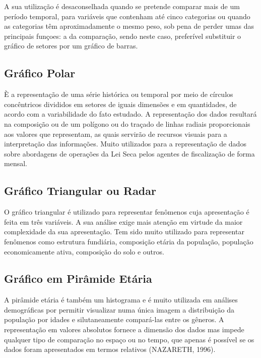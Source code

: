 A sua utilização é desaconselhada quando se pretende comparar mais
de um período temporal, para variáveis que contenham até cinco
categorias ou quando as categorias têm aproximadamente o mesmo
peso, sob pena de perder umas das principais funçoes: a da
comparação, sendo neste caso, preferível substituir o gráfico de
setores por um gráfico de barras.



\subsection{Gráfico Polar}

È a representação de uma série histórica ou temporal por meio de
círculos concêntricos divididos em setores de iguais dimensões e
em quantidades, de acordo com a variabilidade do fato estudado. A
representação dos dados resultará na composição ou de um polígono
ou do traçado de linhas radiais proporcionais aos valores que
representam, as quais servirão de recursos visuais para a
interpretação das informações. Muito utilizados para a
representação de dados sobre abordagens de operações da Lei Seca
pelos agentes de fiscalização de forma mensal.


\subsection{Gráfico Triangular ou Radar}

O gráfico triangular é utilizado para representar fenômenos cuja
apresentação é feita em três variáveis. A sua análise exige mais
atenção em virtude da maior complexidade da sua apresentação. Tem
sido muito utilizado para representar fenômenos como estrutura
fundiária, composição etária da população, população
economicamente ativa, composição do solo e outros.



\subsection{Gráfico em Pirâmide Etária}

A pirâmide etária é também um histograma e é muito utilizada em  análises demográficas por permitir visualizar numa única imagem a distribuição da população por idades e silutaneamente compará-las entre os gêneros. A representação em valores absolutos fornece a dimensão dos dados mas impede qualquer tipo de comparação no espaço ou no tempo, que apenas é possível se os dados foram apresentados em termos relativos (NAZARETH, 1996). 
\vskip0.3cm

